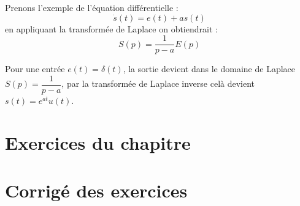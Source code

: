 Prenons l'exemple de l'équation différentielle :
\[
    \dot{s}(t)=e(t)+as(t)
\]
en appliquant la transformée de Laplace on obtiendrait :
\[
    S(p)=\dfrac{1}{p-a}E(p)
\]

Pour une entrée $e(t)=\delta(t)$, la sortie devient dans le domaine de Laplace $S(p)=\dfrac{1}{p-a}$, par la transformée de Laplace
inverse celà devient $s(t)=e^{at}u(t)$.
\clearpage
\section{Exercices du chapitre}
\small

\setcounter{numexos}{0}
\normalsize
\newpage
\restoregeometry
\captionsetup{width=0.9\linewidth}
\section{Corrigé des exercices}
\small

\normalsize
\restoregeometry
\captionsetup{width=0.9\linewidth}
